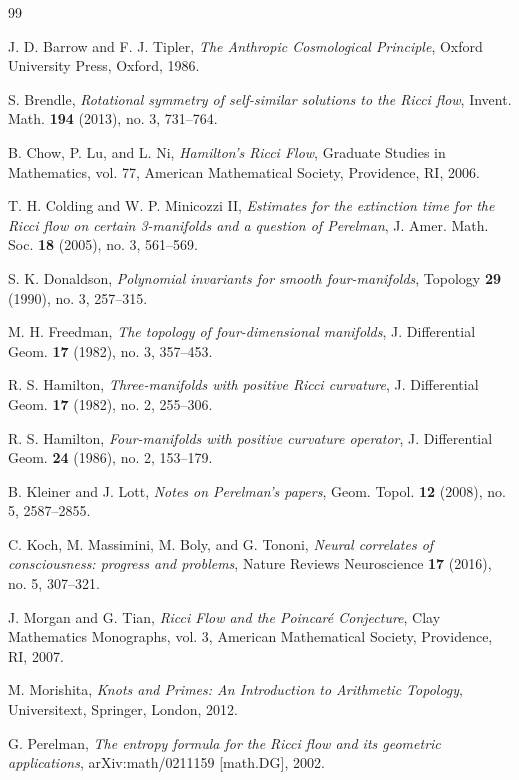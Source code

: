 \documentclass[12pt]{article}
\begin{document}

\begin{thebibliography}{99}

 J. D. Barrow and F. J. Tipler, \emph{The Anthropic Cosmological Principle}, Oxford University Press, Oxford, 1986.

 S. Brendle, \emph{Rotational symmetry of self-similar solutions to the Ricci flow}, Invent. Math. \textbf{194} (2013), no. 3, 731--764.

 B. Chow, P. Lu, and L. Ni, \emph{Hamilton's Ricci Flow}, Graduate Studies in Mathematics, vol. 77, American Mathematical Society, Providence, RI, 2006.

 T. H. Colding and W. P. Minicozzi II, \emph{Estimates for the extinction time for the Ricci flow on certain 3-manifolds and a question of Perelman}, J. Amer. Math. Soc. \textbf{18} (2005), no. 3, 561--569.

 S. K. Donaldson, \emph{Polynomial invariants for smooth four-manifolds}, Topology \textbf{29} (1990), no. 3, 257--315.

 M. H. Freedman, \emph{The topology of four-dimensional manifolds}, J. Differential Geom. \textbf{17} (1982), no. 3, 357--453.

 R. S. Hamilton, \emph{Three-manifolds with positive Ricci curvature}, J. Differential Geom. \textbf{17} (1982), no. 2, 255--306.

 R. S. Hamilton, \emph{Four-manifolds with positive curvature operator}, J. Differential Geom. \textbf{24} (1986), no. 2, 153--179.

 B. Kleiner and J. Lott, \emph{Notes on Perelman's papers}, Geom. Topol. \textbf{12} (2008), no. 5, 2587--2855.

 C. Koch, M. Massimini, M. Boly, and G. Tononi, \emph{Neural correlates of consciousness: progress and problems}, Nature Reviews Neuroscience \textbf{17} (2016), no. 5, 307--321.

 J. Morgan and G. Tian, \emph{Ricci Flow and the Poincaré Conjecture}, Clay Mathematics Monographs, vol. 3, American Mathematical Society, Providence, RI, 2007.

 M. Morishita, \emph{Knots and Primes: An Introduction to Arithmetic Topology}, Universitext, Springer, London, 2012.

 G. Perelman, \emph{The entropy formula for the Ricci flow and its geometric applications}, arXiv:math/0211159 [math.DG], 2002.


\end{thebibliography}
\end{document}
